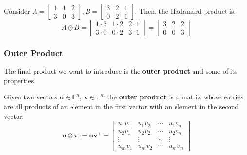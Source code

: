 \documentclass[../lecture-notes.tex]{subfiles}
\begin{document}
\begin{example}
    Consider $A = \begin{bmatrix}
        1 & 1 & 2 \\
        3 & 0 & 3
    \end{bmatrix}, B = \begin{bmatrix}
        3 & 2 & 1 \\ 0 & 2 & 1
    \end{bmatrix}$. Then, the Hadamard product is:
    \begin{equation*}
        A \odot B = \begin{bmatrix}
            1 \cdot 3 & 1 \cdot 2 & 2 \cdot 1 \\
            3 \cdot 0 & 0 \cdot 2 & 3 \cdot 1
        \end{bmatrix} = \begin{bmatrix}
            3 & 2 & 2 \\
            0 & 0 & 3
        \end{bmatrix}
    \end{equation*}
\end{example}

\subsubsection{Outer Product}

The final product we want to introduce is the \textbf{outer product} and some of its properties.

\begin{definition}
    Given two vectors $\mathbf{u} \in \mathbb{F}^n$, $\mathbf{v} \in \mathbb{F}^m$ the \textbf{outer product} is a
    matrix whose entries are all products of an element in the first vector with an element 
    in the second vector:
    \begin{equation*}
        \mathbf{u} \otimes \mathbf{v} := \mathbf{u}\mathbf{v}^{\top} = \begin{bmatrix}
            u_1 v_1 & u_1 v_2 & \cdots & u_1 v_n \\
            u_2 v_1 & u_2 v_2 & \cdots & u_2 v_n \\
            \vdots & \vdots & \ddots & \vdots \\
            u_m v_1 & u_m v_2 & \cdots & u_m v_n
        \end{bmatrix}
    \end{equation*}
\end{definition}
\end{document}
